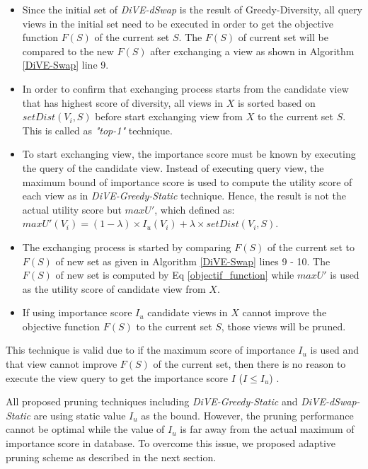 {\begin{itemize}
	\item Since the initial set of \textit{ DiVE-dSwap} is the result of Greedy-Diversity, all query views in the initial set need to be executed in order to get the objective function $F(S)$ of the current set $S$. The $F(S)$ of current set will be compared to the new $F(S)$ after exchanging a view as shown in Algorithm \ref{DiVE-Swap} line 9.
	\item In order to confirm that exchanging process starts from the candidate view that has highest score of diversity, all views in $X$ is sorted based on $ setDist\left(V_i, S\right)  $ before start exchanging view from $ X $ to the current set $S$. This is called as \textit{"top-1"} technique. 
	\item To start exchanging view, the importance score must be known by executing the query of the candidate view. Instead of executing query view, the maximum bound of importance score is used to compute the utility score of each view as in \textit{DiVE-Greedy-Static} technique. Hence, the result is not the actual utility score but $ maxU' $, which defined as: $ 	maxU'\left(V_i\right)= \left(1-\lambda\right) \times I_u\left(V_i\right) + \lambda \times setDist\left(V_i, S\right) $.
	\item The exchanging process is started by comparing $F(S)$ of the current set to $F(S)$ of new set as given in Algorithm \ref{DiVE-Swap} lines 9 - 10. The $F(S)$ of new set is computed by Eq \ref{objectif_function} while $ maxU' $ is used as the utility score of candidate view from $ X $.
	\item If using importance score $I_u$ candidate views in $X$ cannot improve the objective function $F(S)$ to the current set $S$, those views will be pruned. 
\end{itemize}

This technique is valid due to if the maximum score of importance $I_u$ is used and that view cannot improve $F(S)$ of the current set, then there is no reason to execute the view query to get the importance score $I$ ($I \leq I_u$) . 


All proposed pruning techniques including \textit{DiVE-Greedy-Static} and \textit{DiVE-dSwap-Static} are using static value $I_u$ as the bound. However, the pruning performance cannot be optimal while the value of $I_u$ is far away from the actual maximum of importance score in database. To overcome this issue, we proposed adaptive pruning scheme as described in the next section. 
}

